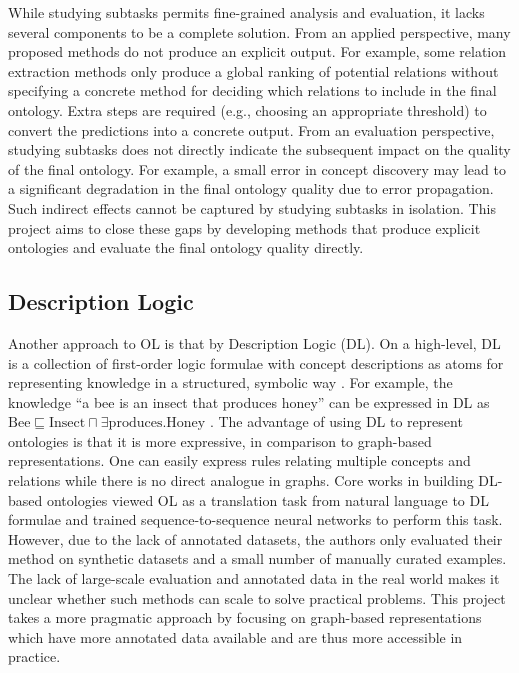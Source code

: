 While studying subtasks permits fine-grained analysis and evaluation, it lacks several components to be a complete solution. From an applied perspective, many proposed methods do not produce an explicit output. For example, some relation extraction methods only produce a global ranking of potential relations \cite{roller2018hearst} without specifying a concrete method for deciding which relations to include in the final ontology. Extra steps are required (e.g., choosing an appropriate threshold) to convert the predictions into a concrete output. From an evaluation perspective, studying subtasks does not directly indicate the subsequent impact on the quality of the final ontology. For example, a small error in concept discovery may lead to a significant degradation in the final ontology quality due to error propagation. Such indirect effects cannot be captured by studying subtasks in isolation. This project aims to close these gaps by developing methods that produce explicit ontologies and evaluate the final ontology quality directly.

\subsection{Description Logic}

Another approach to OL is that by Description Logic (DL). On a high-level, DL is a collection of first-order logic formulae with concept descriptions as atoms for representing knowledge in a structured, symbolic way \cite{baader2017introduction}. For example, the knowledge ``a bee is an insect that produces honey'' can be expressed in DL as
    {
        \sffamily
        $\text{Bee} \sqsubseteq \text{Insect} \sqcap  \exists \text{produces}. \text{Honey}$
    }.
The advantage of using DL to represent ontologies is that it is more expressive, in comparison to graph-based representations. One can easily express rules relating multiple concepts and relations while there is no direct analogue in graphs. Core works in building DL-based ontologies viewed OL as a translation task from natural language to DL formulae \citet{petrucci2016ontology,petrucci2018expressive} and trained sequence-to-sequence neural networks to perform this task. However, due to the lack of annotated datasets, the authors only evaluated their method on synthetic datasets and a small number of manually curated examples. The lack of large-scale evaluation and annotated data in the real world makes it unclear whether such methods can scale to solve practical problems. This project takes a more pragmatic approach by focusing on graph-based representations which have more annotated data available and are thus more accessible in practice.

